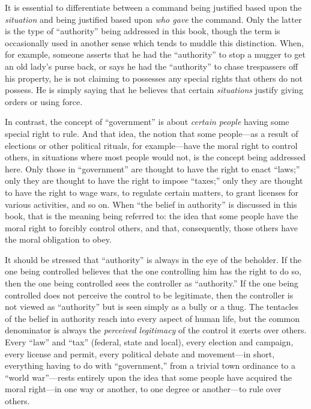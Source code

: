 \documentclass{book}
\begin{document}
It is essential to differentiate between a command being justified based upon the \emph{situation} and being justified based upon \emph{who gave} the command. Only the latter is the type of \enquote{authority} being addressed in this book, though the term is occasionally used in another sense which tends to muddle this distinction. When, for example, someone asserts that he had the \enquote{authority} to stop a mugger to get an old lady's purse back, or says he had the \enquote{authority} to chase trespassers off his property, he is not claiming to possesses any special rights that others do not possess. He is simply saying that he believes that certain \emph{situations} justify giving orders or using force.

In contrast, the concept of \enquote{government} is about \emph{certain people} having some special right to rule. And that idea, the notion that some people---as a result of elections or other political rituals, for example---have the moral right to control others, in situations where most people would not, is the concept being addressed here. Only those in \enquote{government} are thought to have the right to enact \enquote{laws;} only they are thought to have the right to impose \enquote{taxes;} only they are thought to have the right to wage wars, to regulate certain matters, to grant licenses for various activities, and so on. When \enquote{the belief in authority} is discussed in this book, that is the meaning being referred to: the idea that some people have the moral right to forcibly control others, and that, consequently, those others have the moral obligation to obey.

It should be stressed that \enquote{authority} is always in the eye of the beholder. If the one being controlled believes that the one controlling him has the right to do so, then the one being controlled sees the controller as \enquote{authority.} If the one being controlled does not perceive the control to be legitimate, then the controller is not viewed as \enquote{authority} but is seen simply as a bully or a thug. The tentacles of the belief in authority reach into every aspect of human life, but the common denominator is always the \emph{perceived legitimacy} of the control it exerts over others. Every \enquote{law} and \enquote{tax} (federal, state and local), every election and campaign, every license and permit, every political debate and movement---in short, everything having to do with \enquote{government,} from a trivial town ordinance to a \enquote{world war}---rests entirely upon the idea that some people have acquired the moral right---in one way or another, to one degree or another---to rule over others.
\end{document}
